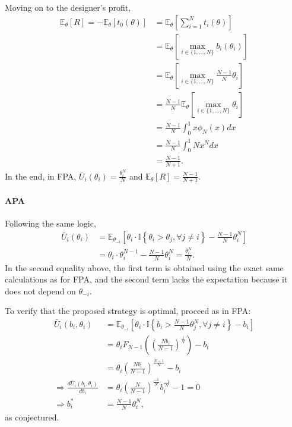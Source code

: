 \documentclass[a4paper]{article}
\begin{document}
Moving on to the designer's profit, 
\begin{align*}
	\mathbb{E}_\theta [R] = - \mathbb{E}_\theta[t_0(\theta)]
	&= \mathbb{E}_\theta \left[ \sum_{i=1}^N t_i(\theta) \right]
	\\
	&= \mathbb{E}_\theta \left[ \max_{i \in \{1,...,N\}} b_i(\theta_i) \right]
	\\
	&= \mathbb{E}_\theta \left[ \max_{i \in \{1,...,N\}} \frac{N-1}{N} \theta_i \right]
	\\
	&= \frac{N-1}{N} \mathbb{E}_\theta \left[ \max_{i \in \{1,...,N\}} \theta_i \right]
	\\
	&= \frac{N-1}{N} \int_0^1 x \phi_{N} (x) dx
	\\
	&= \frac{N-1}{N} \int_0^1 N x^N dx
	\\
	&= \frac{N-1}{N+1}.
\end{align*}
In the end, in FPA, $\bar{U}_i(\theta_i) = \frac{\theta_i^N}{N}$ and $\mathbb{E}_\theta [R] = 
\frac{N-1}{N+1}$.


\paragraph*{APA}
Following the same logic,
\begin{align*}
	\bar{U}_i(\theta_i) &= \mathbb{E}_{\theta_{-i}} \left[ \theta_i \cdot \mathbb{I} \left\{ \theta_i > \theta_j, \forall j \neq i \right\} - \frac{N-1}{N} \theta_i^N \right]
	\\
	&= \theta_i \cdot \theta_i^{N-1} - \frac{N-1}{N} \theta_i^N
	= \frac{\theta_i^N}{N}.
\end{align*}
In the second equality above, the first term is obtained using the exact same calculations as for FPA, and the second term lacks the expectation because it does not depend on $\theta_{-i}$.

To verify that the proposed strategy is optimal, proceed as in FPA:
\begin{align*}
	\bar{U}_i(b_i,\theta_i) &= \mathbb{E}_{\theta_{-i}} \left[ \theta_i \cdot \mathbb{I} \left\{ b_i > \frac{N-1}{N} \theta_j^N, \forall j \neq i \right\} - b_i \right]
	\\
	&= \theta_i F_{N-1} \left( \left( \frac{ N b_i}{N-1} \right)^\frac{1}{N} \right) - b_i
	\\
	&= \theta_i \left( \frac{ N b_i}{N-1} \right)^\frac{N-1}{N} - b_i
	\\ \Rightarrow
	\frac{d \bar{U}_i(b_i,\theta_i)}{db_i} 
	&= \theta_i \left( \frac{ N }{N-1} \right)^\frac{-1}{N} b_i^\frac{-1}{N} - 1 = 0
	\\ \Rightarrow
	b_i^* &= \frac{N-1}{N} \theta_i^N,
\end{align*}
as conjectured.
\end{document}
